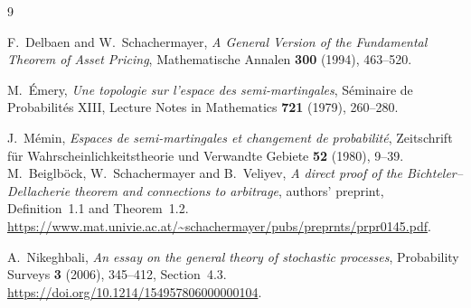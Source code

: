 \begin{thebibliography}{9}
\raggedright
{}
F.~Delbaen and W.~Schachermayer,
\emph{A General Version of the Fundamental Theorem of Asset Pricing},
Mathematische Annalen \textbf{300} (1994), 463--520.

M.~\'{E}mery,
\emph{Une topologie sur l'espace des semi-martingales},
S\'{e}minaire de Probabilit\'{e}s XIII, Lecture Notes in Mathematics \textbf{721}
(1979), 260--280.

J.~M\'{e}min,
\emph{Espaces de semi-martingales et changement de probabilit\'{e}},
Zeitschrift f\"ur Wahrscheinlichkeitstheorie und Verwandte Gebiete
\textbf{52} (1980), 9--39.
M.~Beiglb\"ock, W.~Schachermayer and B.~Veliyev,
\emph{A direct proof of the Bichteler--Dellacherie theorem and connections to arbitrage},
authors' preprint, Definition~1.1 and Theorem~1.2.
\url{https://www.mat.univie.ac.at/~schachermayer/pubs/preprnts/prpr0145.pdf}.

A.~Nikeghbali,
\emph{An essay on the general theory of stochastic processes},
Probability Surveys \textbf{3} (2006), 345--412, Section~4.3.
\url{https://doi.org/10.1214/154957806000000104}.
\end{thebibliography}
